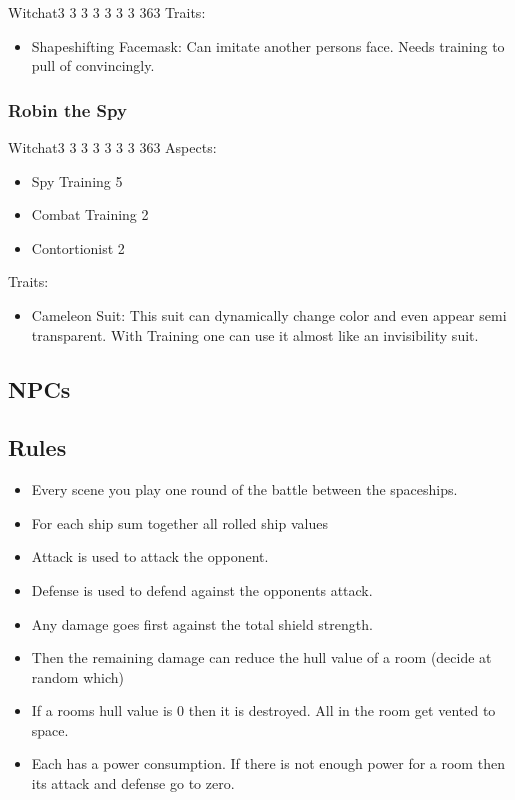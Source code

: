 \documentclass[11pt]{article}
\begin{document}
{\begin{npc}{Witch}{at}{3 3 3 3 3 3 3 3}{63}
Traits:
\begin{itemize}
\item Shapeshifting Facemask: Can imitate another persons face. Needs training to pull of convincingly.
\end{itemize}
\end{npc}
\subsubsection{Robin the Spy}
\label{sec:orgfb646fb}

\begin{npc}{Witch}{at}{3 3 3 3 3 3 3 3}{63}
Aspects:
\begin{itemize}
\item Spy  Training 5
\item Combat Training 2
\item Contortionist 2
\end{itemize}
\columnbreak

Traits:
\begin{itemize}
\item Cameleon Suit: This suit can dynamically change color and even appear semi transparent. With Training one can use it almost like an invisibility suit.
\end{itemize}
\end{npc}
\subsection{NPCs}
\label{sec:orgee874f0}

\subsection{Rules}
\label{sec:org1d0cbec}

\begin{itemize}
\item Every scene you play one round of the battle between the spaceships.
\item For each ship sum together all rolled ship values
\item Attack is used to attack the opponent.
\item Defense is used to defend against the opponents attack.
\item Any damage goes first against the total shield strength.
\item Then the remaining damage can reduce the hull value of a room (decide at random which)
\item If a rooms hull value is 0 then it is destroyed. All in the room get vented to space.
\item Each has a power consumption. If there is not enough power for a room then its attack and defense go to zero.
\end{itemize}
}
\end{document}
